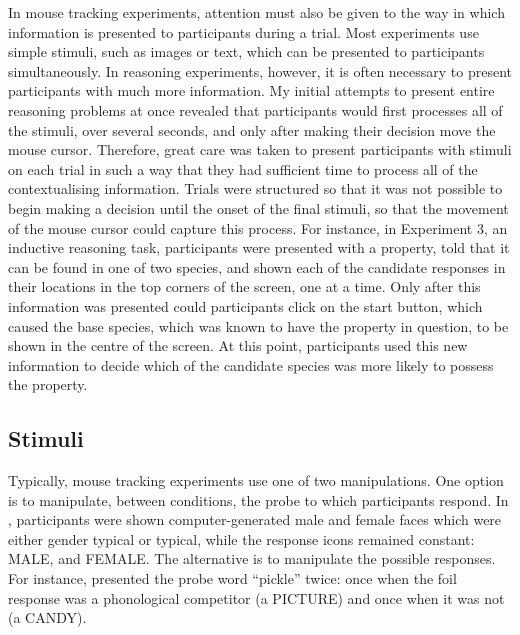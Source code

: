 
In mouse tracking experiments, attention must also be given to
the way in which information is presented to participants
during a trial.
Most experiments use simple stimuli,
such as images or text, which can be presented to participants simultaneously.
In reasoning experiments, however, it is often necessary
to present participants with much more information.
My initial attempts to present entire reasoning problems at once
revealed that participants would first processes all of the stimuli,
over several seconds, and only after making their decision
move the mouse cursor.
Therefore, great care was taken 
to present participants with stimuli on each trial
in such a way that they had sufficient time 
to process all of the contextualising information.
Trials were structured so that it was not possible
to begin making a decision until the onset of the final stimuli, 
so that the movement of the mouse cursor could capture this process.
For instance, in Experiment 3,
an inductive reasoning task,
participants were presented with a property,
told that it can be found in one of two species,
and shown each of the candidate responses 
in their locations in the top corners of the screen, one at a time.
Only after this information was presented could participants
click on the start button, which caused the base species,
which was known to have the property in question,
to be shown in the centre of the screen.
At this point, participants used this new information
to decide which of the candidate species
was more likely to possess the property.


\subsection{Stimuli}\label{sec:mousetracking-stimuli}

Typically, mouse tracking experiments use one of two manipulations.
One option is to manipulate, between conditions, the probe to which participants respond.
In \citet{Freeman2008}, participants were shown
computer-generated male and female faces which were either gender typical or typical,
while the response icons remained constant: MALE, and FEMALE.
The alternative is to manipulate the possible responses.
For instance, \citet{Spivey2005} presented the probe word ``pickle'' twice:
once when the foil response was a phonological competitor (a PICTURE)
and once when it was not (a CANDY).

